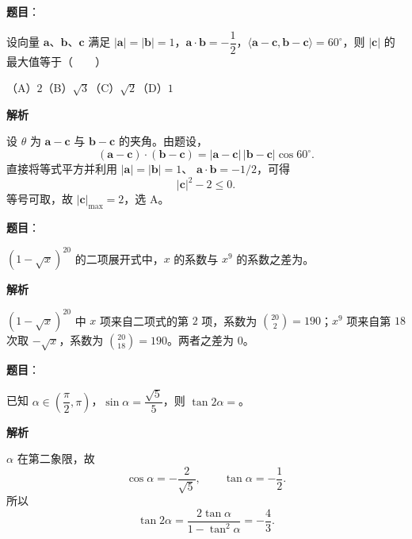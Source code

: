 \begin{answer}

\textbf{题目}：

设向量 $\boldsymbol a\text{、}\boldsymbol b\text{、}\boldsymbol c$ 满足 $|\boldsymbol a|=|\boldsymbol b|=1$，$\boldsymbol a\cdot\boldsymbol b=-\dfrac12$，$\langle\boldsymbol a-\boldsymbol c,\boldsymbol b-\boldsymbol c\rangle=60^\circ$，则 $|\boldsymbol c|$ 的最大值等于\mbox{（　　）}

（A）$2$\quad（B）$\sqrt3$\quad（C）$\sqrt2$\quad（D）$1$

\textbf{解析}

设 $\theta$ 为 $\boldsymbol a-\boldsymbol c$ 与
$\boldsymbol b-\boldsymbol c$ 的夹角。由题设，
\nopagebreak[4]
\[
(\boldsymbol a-\boldsymbol c)\cdot
(\boldsymbol b-\boldsymbol c)
=|\boldsymbol a-\boldsymbol c|\,|\boldsymbol b-\boldsymbol c|
\cos60^\circ.
\]
直接将等式平方并利用
$|\boldsymbol a|=|\boldsymbol b|=1$、
$\boldsymbol a\cdot\boldsymbol b=-1/2$，可得
\nopagebreak[4]
\[
|\boldsymbol c|^2-2
\leq0.
\]
等号可取，故 $|\boldsymbol c|_{\max}=2$，选 A。


\end{answer}
\begin{answer}

\textbf{题目}：

$(1-\sqrt{x})^{20}$ 的二项展开式中，$x$ 的系数与 $x^9$ 的系数之差为\gkblank{}。

\textbf{解析}

$(1-\sqrt x)^{20}$ 中 $x$ 项来自二项式的第 $2$ 项，系数为
$\binom{20}{2}=190$；$x^9$ 项来自第 $18$ 次取
$-\sqrt x$，系数为
$\binom{20}{18}=190$。两者之差为 $0$。


\end{answer}
\begin{answer}

\textbf{题目}：

已知 $\alpha\in\left(\dfrac\pi2,\pi\right)$，$\sin\alpha=\dfrac{\sqrt5}{5}$，则 $\tan2\alpha=$\gkblank{}。

\textbf{解析}

$\alpha$ 在第二象限，故
\nopagebreak[4]
\[
\cos\alpha=-\frac2{\sqrt5},\qquad
\tan\alpha=-\frac12.
\]
所以
\nopagebreak[4]
\[
\tan2\alpha
=\frac{2\tan\alpha}{1-\tan^2\alpha}
=-\frac43.
\]


\end{answer}

